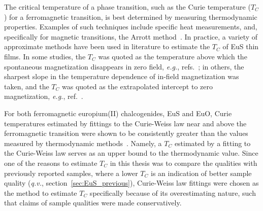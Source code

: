 The critical temperature of a phase transition, such as the Curie temperature ($T_C$) for a ferromagnetic transition, is best determined by measuring thermodynamic properties. Examples of such techniques include specific heat measurements, and, specifically for magnetic transitions, the Arrott method~\cite{Arrott1957}. In practice, a variety of approximate methods have been used in literature to estimate the $T_C$ of EuS thin films. In some studies, the $T_C$ was quoted as the temperature above which the spontaneous magnetization disappears in zero field, \textit{e.g.}, refs.~\cite{EuS_MBE_Dauth, Moodera2013}; in others, the sharpest slope in the temperature dependence of in-field magnetization was taken, and the $T_C$ was quoted as the extrapolated intercept to zero magnetization, \textit{e.g.}, ref.~\cite{EuS_PLD1}.

For both ferromagnetic europium(II) chalcogenides, EuS and EuO, Curie temperatures estimated by fittings to the Curie-Weiss law near and above the ferromagnetic transition were shown to be consistently greater than the values measured by thermodynamic methods~\cite{Eu_mag_compounds}. Namely, a $T_C$ estimated by a fitting to the Curie-Weiss law serves as an upper bound to the thermodynamic value. Since one of the reasons to estimate $T_C$ in this thesis was to compare the qualities with previously reported samples, where a lower $T_C$ is an indication of better sample quality (\textit{q.v.}, section~\ref{sec:EuS_previous}), Curie-Weiss law fittings were chosen as the method to estimate $T_C$ specifically because of its overestimating nature, such that claims of sample qualities were made conservatively.

